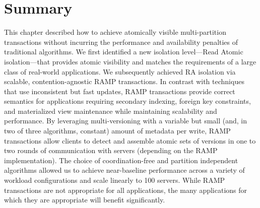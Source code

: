 \section{Summary}
\label{sec:conclusion}

This chapter described how to achieve atomically visible multi-partition
transactions without incurring the performance and availability
penalties of traditional algorithms. We first identified a new
isolation level---Read Atomic isolation---that provides atomic
visibility and matches the requirements of a large class of real-world
applications. We subsequently achieved RA isolation via scalable,
contention-agnostic RAMP transactions. In contrast with techniques
that use inconsistent but fast updates, RAMP transactions provide
correct semantics for applications requiring secondary indexing,
foreign key constraints, and materialized view maintenance while
maintaining scalability and performance. By leveraging
multi-versioning with a variable but small (and, in two of three
algorithms, constant) amount of metadata per write, RAMP transactions
allow clients to detect and assemble atomic sets of versions in one to
two rounds of communication with servers (depending on the RAMP
implementation). The choice of coordination-free and partition
independent algorithms allowed us to achieve near-baseline performance
across a variety of workload configurations and scale linearly to 100
servers. While RAMP transactions are not appropriate for all
applications, the many applications for which they are appropriate will
benefit significantly.
